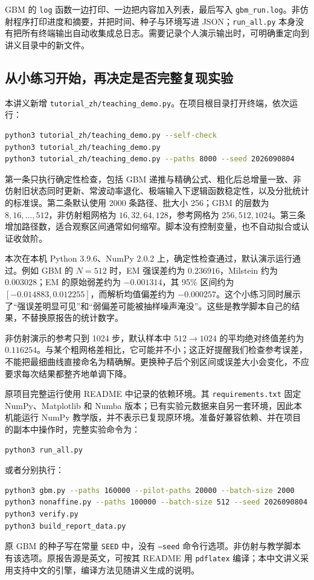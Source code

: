 GBM 的 \texttt{log} 函数一边打印、一边把内容加入列表，最后写入 \texttt{gbm\_run.log}。非仿射程序打印进度和摘要，并把时间、种子与环境写进 JSON；\texttt{run\_all.py} 本身没有把所有终端输出自动收集成总日志。需要记录个人演示输出时，可明确重定向到讲义目录中的新文件。

\subsection{从小练习开始，再决定是否完整复现实验}

本讲义新增 \texttt{tutorial\_zh/teaching\_demo.py}。在项目根目录打开终端，依次运行：
\begin{lstlisting}[language=bash]
python3 tutorial_zh/teaching_demo.py --self-check
python3 tutorial_zh/teaching_demo.py
python3 tutorial_zh/teaching_demo.py --paths 8000 --seed 2026090804
\end{lstlisting}
第一条只执行确定性检查，包括 GBM 递推与精确公式、粗化后总增量一致、非仿射旧状态同时更新、常波动率退化、极端输入下逻辑函数稳定性，以及分批统计的标准误。第二条默认使用 2000 条路径、批大小 256；GBM 的层数为 $8,16,\ldots,512$，非仿射粗网格为 $16,32,64,128$，参考网格为 $256,512,1024$。第三条增加路径数，适合观察区间通常如何缩窄。脚本没有控制变量，也不自动拟合或认证收敛阶。

本次在本机 Python 3.9.6、NumPy 2.0.2 上，确定性检查通过，默认演示运行通过。例如 GBM 的 $N=512$ 时，EM 强误差约为 $0.236916$，Milstein 约为 $0.003028$；EM 的原始弱差约为 $-0.001314$，其 95\% 区间约为 $[-0.014883,0.012255]$，而解析均值偏差约为 $-0.000257$。这个小练习同时展示了“强误差明显可见”和“弱偏差可能被抽样噪声淹没”。这些是教学脚本自己的结果，不替换原报告的统计数字。

非仿射演示的参考只到 1024 步，默认样本中 $512\to1024$ 的平均绝对终值差约为 $0.116254$。与某个粗网格差相比，它可能并不小；这正好提醒我们检查参考误差，不能把最细曲线直接命名为精确解。更换种子后个别区间或误差大小会变化，不应要求每次结果都整齐地单调下降。

原项目完整运行使用 README 中记录的依赖环境。其 \texttt{requirements.txt} 固定 NumPy、Matplotlib 和 Numba 版本；已有实验元数据来自另一套环境，因此本机能运行 NumPy 教学版，并不表示已复现原环境。准备好兼容依赖、并在项目的副本中操作时，完整实验命令为：
\begin{lstlisting}[language=bash]
python3 run_all.py
\end{lstlisting}
或者分别执行：
\begin{lstlisting}[language=bash]
python3 gbm.py --paths 160000 --pilot-paths 20000 --batch-size 2000
python3 nonaffine.py --paths 100000 --batch-size 512 --seed 2026090804
python3 verify.py
python3 build_report_data.py
\end{lstlisting}
原 GBM 的种子写在常量 \texttt{SEED} 中，没有 \texttt{--seed} 命令行选项。非仿射与教学脚本有该选项。原报告源是英文，可按其 README 用 \texttt{pdflatex} 编译；本中文讲义采用支持中文的引擎，编译方法见随讲义生成的说明。

